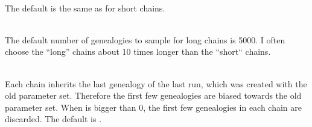 \begin{description}
\item{}\\
The default is the same as for short chains. 

\item{}\\
The default number of genealogies to sample for long chains is 5000.
I often choose the ``long'' chains about 10 times longer than the ``short`` chains.
\item{}\\
Each chain
inherits the last genealogy of the last run, which was created with the old parameter set. Therefore the first few genealogies are biased towards the old parameter set. When {} is bigger than 0, the first few genealogies
in each chain are discarded. 
The default is {}.


\end{description}
